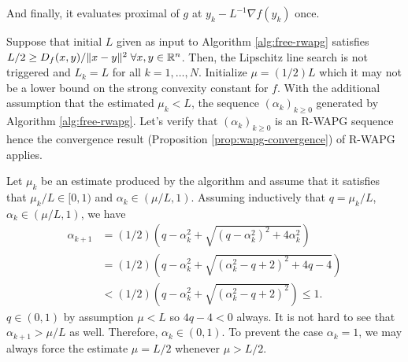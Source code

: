 \documentclass[12pt]{article}
\begin{document}
    And finally, it evaluates proximal of $g$ at $y_k - L^{-1}\nabla f(y_k)$ once.
    \par
    Suppose that initial $L$ given as input to Algorithm \ref{alg:free-rwapg} satisfies $L/2 \ge D_f(x, y)/\Vert x - y\Vert^2\;\forall x, y \in \mathbb R^n$.
    Then, the Lipschitz line search is not triggered and $L_k = L$ for all $k = 1, \ldots, N$.
    Initialize $\mu = (1/2)L$ which it may not be a lower bound on the strong convexity constant for $f$.
    With the additional assumption that the estimated $\mu_k < L$, the sequence $(\alpha_k)_{k \ge 0}$ generated by Algorithm \ref{alg:free-rwapg}.
    Let's verify that $(\alpha_k)_{k \ge 0}$ is an R-WAPG sequence hence the convergence result (Proposition \ref{prop:wapg-convergence}) of R-WAPG applies.
    \par
    Let $\mu_k$ be an estimate produced by the algorithm and assume that it satisfies that $\mu_k/ L \in [0, 1)$ and $\alpha_k \in (\mu/L, 1)$.
    Assuming inductively that $q = \mu_k/L$,  $\alpha_k \in (\mu/L, 1)$, we have
    \begin{align*}
        \alpha_{k + 1}
        &=
        (1/2)\left(
            q - \alpha_k^2 + \sqrt{(q - \alpha_k^2)^2 + 4 \alpha_k^2}
        \right)
        \\
        &=
        (1/2)\left(
            q - \alpha_k^2 + \sqrt{
                (\alpha_k^2 - q + 2)^2 + 4q - 4
            }
        \right)
        \\
        &<
        (1/2)\left(
            q - \alpha_k^2 + \sqrt{
                (\alpha_k^2 - q + 2)^2
            }
        \right) \le 1.
    \end{align*}
    $q \in (0, 1)$ by assumption $\mu < L$ so $4q - 4 < 0$ always.
    It is not hard to see that $\alpha_{k + 1} > \mu/L$ as well.
    Therefore, $\alpha_k \in (0, 1)$.
    To prevent the case $\alpha_k = 1$, we may always force the estimate $\mu = L/2$ whenever $\mu > L/2$.
\end{document}
